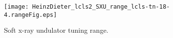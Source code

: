\begin{wrapfigure}[27]{l}{.5\linewidth}
\centerline{
	\texttt{[image: HeinzDieter\_lcls2\_SXU\_range\_lcls-tn-18-4.rangeFig.eps]}
	}
	\caption{\label{fig::sxu_K} Soft x-ray undulator tuning range. \cite{HeinzDieter_SXU_twocolor,}
		}
\end{wrapfigure}
